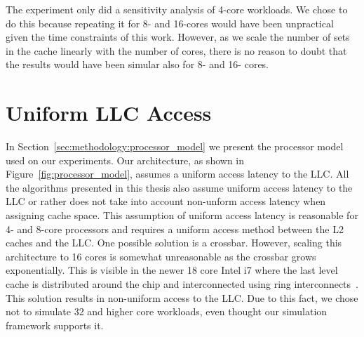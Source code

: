 The experiment only did a sensitivity analysis of 4-core workloads. 
We chose to do this because repeating it for 8- and 16-cores would have been unpractical given the time constraints of this work. 
However, as we scale the number of sets in the cache linearly with the number of cores, there is no reason to doubt that the results would have been simular also for 8- and 16- cores.


\section{Uniform LLC Access}

In Section~\ref{sec:methodology:processor_model} we present the processor model used on our experiments.
Our architecture, as shown in Figure~\ref{fig:processor_model}, assumes a uniform access latency to the LLC.
All the algorithms presented in this thesis also assume uniform access latency to the LLC or rather does not take into account non-unform access latency when assigning cache space.
This assumption of uniform access latency is reasonable for 4- and 8-core processors and requires a uniform access method between the L2 caches and the LLC.
One possible solution is a crossbar.
However, scaling this architecture to 16 cores is somewhat unreasonable as the crossbar grows exponentially.
This is visible in the newer 18 core Intel i7 where the last level cache is distributed around the chip and interconnected using ring interconnects~\cite{Hruska2014}.
This solution results in non-uniform access to the LLC.
Due to this fact, we chose not to simulate 32 and higher core workloads, even thought our simulation framework supports it.